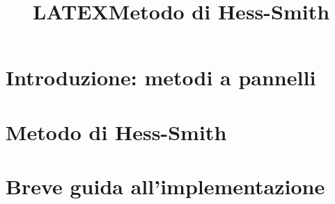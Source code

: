 \documentclass[pdftex,10pt,a4paper]{article} %
\author{}
\title{LATEX}
\title{Metodo di Hess-Smith}
\begin{document}
\maketitle


\tableofcontents

\vspace{1.5cm}

\section{Introduzione: metodi a pannelli}
\label{cap.00}


\section{Metodo di Hess-Smith}
\label{cap.01}


\section{Breve guida all'implementazione}
\label{cap.02}


\newpage

\appendix
\end{document}

